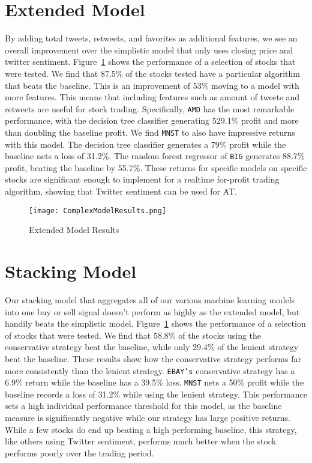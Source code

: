 \documentclass[../thesis.tex]{subfiles}
\begin{document}
\section{Extended Model}
By adding total tweets, retweets, and favorites as additional features, we see an overall improvement over the simplistic model that only uses closing price and twitter sentiment. Figure~\ref{complexresults} shows the performance of a selection of stocks that were tested. We find that 87.5\% of the stocks tested have a particular algorithm that beats the baseline. This is an improvement of 53\% moving to a model with more features. This means that including features such as amount of tweets and retweets are useful for stock trading. Specifically, \texttt{AMD} has the most remarkable performance, with the decision tree classifier generating 529.1\% profit and more than doubling the baseline profit. We find \texttt{MNST} to also have impressive returns with this model. The decision tree classifier generates a 79\% profit while the baseline nets a loss of 31.2\%. The random forest regressor of \texttt{BIG} generates 88.7\% profit, beating the baseline by 55.7\%. These returns for specific models on specific stocks are significant enough to implement for a realtime for-profit trading algorithm, showing that Twitter sentiment can be used for AT. 

\begin{figure}[h]
\centering
\texttt{[image: ComplexModelResults.png]}
\caption{Extended Model Results \label{overflow}}
\label{complexresults}
\end{figure}

\section{Stacking Model}
Our stacking model that aggregates all of our various machine learning models into one buy or sell signal doesn't perform as highly as the extended model, but handily beats the simplistic model. Figure~\ref{complexresults} shows the performance of a selection of stocks that were tested. We find that 58.8\% of the stocks using the conservative strategy beat the baseline, while only 29.4\% of the lenient strategy beat the baseline. These results show how the conservative strategy performs far more consistently than the lenient strategy. \texttt{EBAY's} conservative strategy has a 6.9\% return while the baseline has a 39.5\% loss. \texttt{MNST} nets a 50\% profit while the baseline records a loss of 31.2\% while using the lenient strategy. This performance sets a high individual performance threshold for this model, as the baseline measure is significantly negative while our strategy has large positive returns. While a few stocks do end up beating a high performing baseline, this strategy, like others using Twitter sentiment, performs much better when the stock performs poorly over the trading period. 
\end{document}
